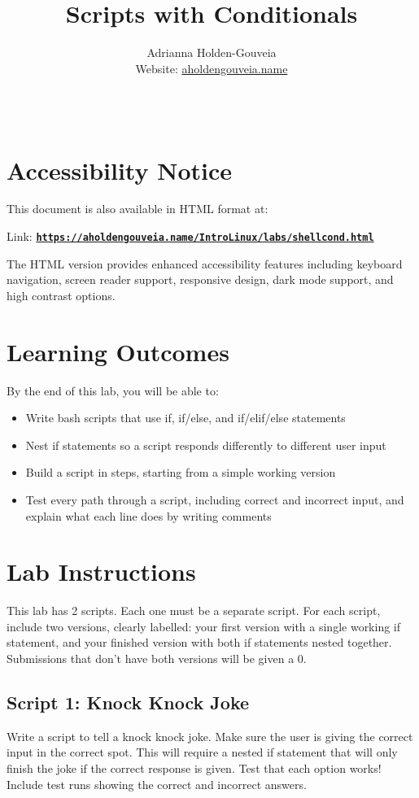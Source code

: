 \documentclass[12pt]{article}
\title{Scripts with Conditionals}
\author{
        Adrianna Holden-Gouveia \\
        Website: \href{https://aholdengouveia.name}{aholdengouveia.name}\\ 
        \date{\vspace{-5ex}}
        \faGithub {: aholdengouveia} \\
        }
\begin{document}
    

\maketitle

\section*{Accessibility Notice}
This document is also available in HTML format at:

Link: \href{https://aholdengouveia.name/IntroLinux/labs/shellcond.html}{\textbf{\nolinkurl{https://aholdengouveia.name/IntroLinux/labs/shellcond.html}}}

The HTML version provides enhanced accessibility features including keyboard navigation, screen reader support, responsive design, dark mode support, and high contrast options.



\section*{Learning Outcomes}
By the end of this lab, you will be able to:
\begin{itemize}
    \item Write bash scripts that use if, if/else, and if/elif/else statements
    \item Nest if statements so a script responds differently to different user input
    \item Build a script in steps, starting from a simple working version
    \item Test every path through a script, including correct and incorrect input, and explain what each line does by writing comments
\end{itemize}
\section*{Lab Instructions}
This lab has 2 scripts. Each one must be a separate script. For each script, include two versions, clearly labelled: your first version with a single working if statement, and your finished version with both if statements nested together.  Submissions that don't have both versions will be given a 0.

\subsection*{Script 1: Knock Knock Joke}
Write a script to tell a knock knock joke. Make sure the user is giving the correct input in the correct spot.    This will require a nested if statement that will only finish the joke if the correct response is given.  Test that each option works! Include test runs showing the correct and incorrect answers.
\end{document}
